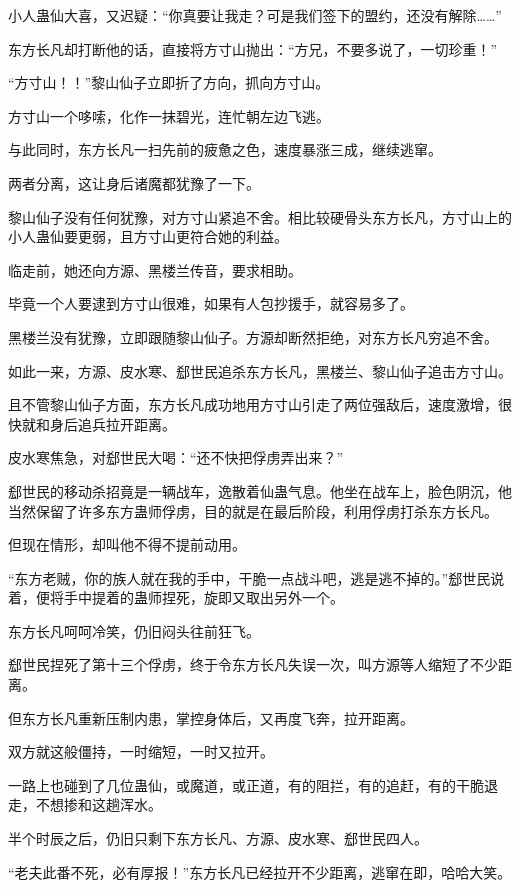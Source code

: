 \begin{this_body}
小人蛊仙大喜，又迟疑：“你真要让我走？可是我们签下的盟约，还没有解除……”

东方长凡却打断他的话，直接将方寸山抛出：“方兄，不要多说了，一切珍重！”

“方寸山！！”黎山仙子立即折了方向，抓向方寸山。

方寸山一个哆嗦，化作一抹碧光，连忙朝左边飞逃。

与此同时，东方长凡一扫先前的疲惫之色，速度暴涨三成，继续逃窜。

两者分离，这让身后诸魔都犹豫了一下。

黎山仙子没有任何犹豫，对方寸山紧追不舍。相比较硬骨头东方长凡，方寸山上的小人蛊仙要更弱，且方寸山更符合她的利益。

临走前，她还向方源、黑楼兰传音，要求相助。

毕竟一个人要逮到方寸山很难，如果有人包抄援手，就容易多了。

黑楼兰没有犹豫，立即跟随黎山仙子。方源却断然拒绝，对东方长凡穷追不舍。

如此一来，方源、皮水寒、郄世民追杀东方长凡，黑楼兰、黎山仙子追击方寸山。

且不管黎山仙子方面，东方长凡成功地用方寸山引走了两位强敌后，速度激增，很快就和身后追兵拉开距离。

皮水寒焦急，对郄世民大喝：“还不快把俘虏弄出来？”

郄世民的移动杀招竟是一辆战车，逸散着仙蛊气息。他坐在战车上，脸色阴沉，他当然保留了许多东方蛊师俘虏，目的就是在最后阶段，利用俘虏打杀东方长凡。

但现在情形，却叫他不得不提前动用。

“东方老贼，你的族人就在我的手中，干脆一点战斗吧，逃是逃不掉的。”郄世民说着，便将手中提着的蛊师捏死，旋即又取出另外一个。

东方长凡呵呵冷笑，仍旧闷头往前狂飞。

郄世民捏死了第十三个俘虏，终于令东方长凡失误一次，叫方源等人缩短了不少距离。

但东方长凡重新压制内患，掌控身体后，又再度飞奔，拉开距离。

双方就这般僵持，一时缩短，一时又拉开。

一路上也碰到了几位蛊仙，或魔道，或正道，有的阻拦，有的追赶，有的干脆退走，不想掺和这趟浑水。

半个时辰之后，仍旧只剩下东方长凡、方源、皮水寒、郄世民四人。

“老夫此番不死，必有厚报！”东方长凡已经拉开不少距离，逃窜在即，哈哈大笑。


\end{this_body}
